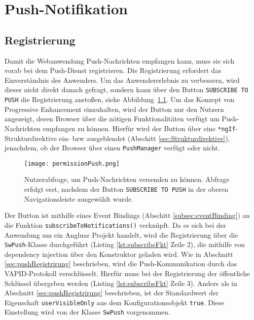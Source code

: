 \chapter{Push-Notifikation}\label{ch:PushNotifikation}

\section{Registrierung}

Damit die Webanwendung Push-Nachrichten empfangen kann, muss sie sich vorab bei dem Push-Dienst registrieren. Die Registrierung erfordert das Einverständnis des Anwenders. 
Um das Anwendererlebnis zu verbessern, wird dieser nicht direkt danach gefragt, sondern kann über den Button \texttt{SUBSCRIBE TO PUSH} die Registrierung anstoßen, siehe Abbildung~\ref{img:permissionPush}. Um das Konzept von Progressive Enhancement einzuhalten, wird der Button nur den Nutzern angezeigt, deren Browser über die nötigen Funktionalitäten verfügt um Push-Nachrichten empfangen zu können. Hierfür wird der Button über eine \texttt{*ngIf}-Strukturdirektive ein- bzw ausgeblendet (Abschitt \ref{sec:Strukturdirektive}), jenachdem, ob der Browser über einen \texttt{PushManager} verfügt oder nicht. 

\begin{figure}[!htb]
    \centering
    \texttt{[image: permissionPush.png]}
    \caption{Nutzerabfrage, um Push-Nachrichten versenden zu können. Abfrage erfolgt erst, nachdem der Button \texttt{SUBSCRIBE TO PUSH} in der oberen Navigationsleiste ausgewählt wurde.}
    \label{img:permissionPush}
\end{figure}

Der Button ist mithilfe eines Event Bindings (Abschitt \ref{subsec:eventBinding}) an die Funktion \linebreak\texttt{subscribeToNotifications()} verknüpft. Da es sich bei der Anwendung um ein Angluar Projekt handelt, 
wird die Registrierung über die \texttt{SwPush}-Klasse durchgeführt (Listing \ref{lst:subscribeFkt} Zeile 2), die mithilfe von dependency injection über den Konstruktor geladen wird. Wie in Abschnitt \ref{sec:pushRegistrirung} beschrieben, wird die Push-Kommunikation durch das VAPID-Protokoll verschlüsselt. Hierfür muss bei der Registrierung der öffentliche Schlüssel übergeben werden (Listing \ref{lst:subscribeFkt} Zeile 3). Anders als in Abschnitt \ref{sec:pushRegistrirung} beschrieben, ist der Standardwert der Eigenschaft \texttt{userVisibleOnly} aus dem Konfigurationsobjekt \texttt{true}. Diese Einstellung wird von der Klasse \texttt{SwPush} vorgenommen. 


